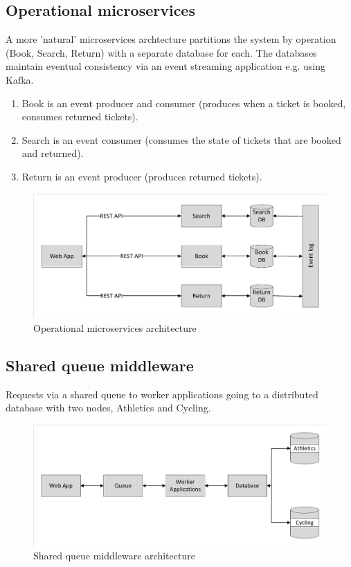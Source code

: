 %
%
\subsection{Operational microservices}

A more 'natural' microservices archtecture partitions the system by operation (Book, Search, Return) with a separate database for each.  The databases maintain eventual consistency via an event streaming application e.g. using Kafka.
\begin{enumerate}
\item Book is an event producer and consumer (produces when a ticket is booked, consumes returned tickets).
\item Search is an event consumer (consumes the state of tickets that are booked and returned).
\item Return is an event producer (produces returned tickets).
\end{enumerate}

\begin{figure}
	\caption{Operational microservices architecture}
	\centering
	\includegraphics[trim = 5 5 5 5, clip, width=\textwidth]{img/operationmicro}
\end{figure}

%
%
\subsection{Shared queue middleware}

Requests via a shared queue to worker applications going to a distributed database with two nodes, Athletics and Cycling.

\begin{figure}
	\caption{Shared queue middleware architecture}
	\centering
	\includegraphics[trim = 5 5 5 5, clip, width=\textwidth]{img/sharedqueue}
\end{figure}

